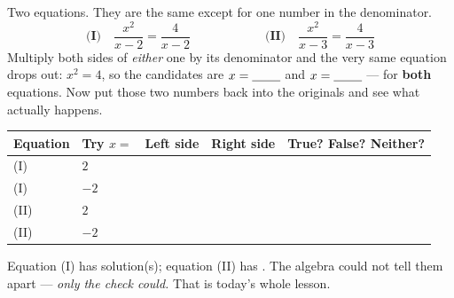 \documentclass[10pt]{article}
\begin{document}
\begin{hookbox}
Two equations. They are the same except for one number in the denominator.
\[ \textbf{(I)}\quad \frac{x^2}{x-2}=\frac{4}{x-2} \qquad\qquad\qquad
   \textbf{(II)}\quad \frac{x^2}{x-3}=\frac{4}{x-3} \]
Multiply both sides of \emph{either} one by its denominator and the very same equation drops out:
$x^2=4$, so the candidates are $x=\blank{0.8cm}$ and $x=\blank{0.8cm}$ --- for \textbf{both}
equations. Now put those two numbers back into the originals and see what actually happens.
\begin{center}
\renewcommand{\arraystretch}{1.6}
\begin{tabularx}{0.96\linewidth}{|C{1.9cm}|C{1.5cm}|C{2.6cm}|C{2.6cm}|X|}
\hline
{}
\textbf{Equation} & \textbf{Try $x=$} & \textbf{Left side} & \textbf{Right side} &
\textbf{True? False? Neither?} \\ \hline
(I)  & $2$  & & & \\ \hline
(I)  & $-2$ & & & \\ \hline
(II) & $2$  & & & \\ \hline
(II) & $-2$ & & & \\ \hline
\end{tabularx}
\end{center}
\vspace{-2pt}
Equation (I) has \blank{0.8cm} solution(s); equation (II) has \blank{0.8cm}. The algebra could not
tell them apart --- \emph{only the check could.} That is today's whole lesson.
\end{hookbox}
\end{document}
